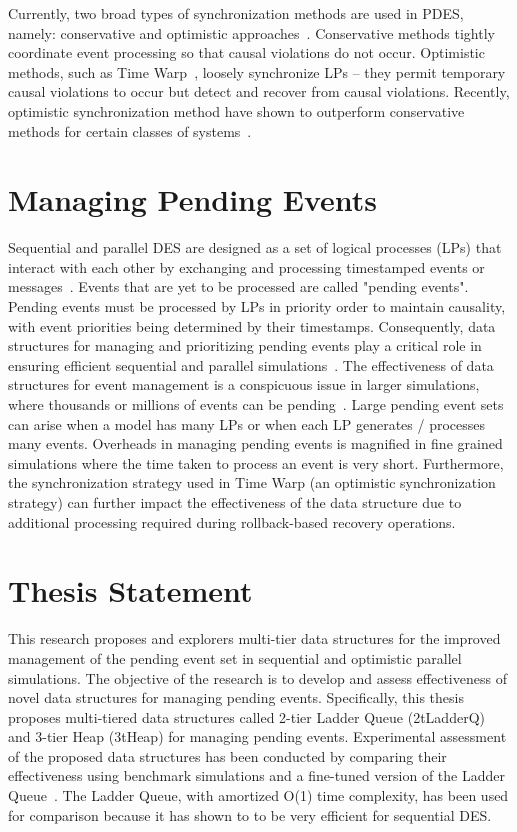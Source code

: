Currently, two broad types of synchronization methods are used in
PDES, namely: conservative and optimistic approaches~\cite{jafer-13}.
Conservative methods tightly coordinate event processing so that
causal violations do not occur.  Optimistic methods, such as Time
Warp~\cite{jafer-13}, loosely synchronize LPs -- they permit temporary
causal violations to occur but detect and recover from causal
violations.  Recently, optimistic synchronization method have shown to
outperform conservative methods for certain classes of
systems~\cite{jafer-13}.


\section{Managing Pending Events}

Sequential and parallel DES are designed as a set of logical processes
(LPs) that interact with each other by exchanging and processing
timestamped events or messages~\cite{jafer-13}. Events that are yet to
be processed are called "pending events". Pending events must be
processed by LPs in priority order to maintain causality, with event
priorities being determined by their timestamps. Consequently, data
structures for managing and prioritizing pending events play a
critical role in ensuring efficient sequential and parallel
simulations~\cite{jones-86,ronngren-97,brown-88,franceschini-15}. The
effectiveness of data structures for event management is a conspicuous
issue in larger simulations, where thousands or millions of events can
be pending~\cite{carothers-2010,yeom-14}. Large pending event sets can
arise when a model has many LPs or when each LP generates / processes
many events. Overheads in managing pending events is magnified in fine
grained simulations where the time taken to process an event is very
short. Furthermore, the synchronization strategy used in Time Warp (an
optimistic synchronization strategy) can further impact the
effectiveness of the data structure due to additional processing
required during rollback-based recovery operations.

\section{Thesis Statement}

This research proposes and explorers multi-tier data structures for
the improved management of the pending event set in sequential and
optimistic parallel simulations.  The objective of the research is to
develop and assess effectiveness of novel data structures for managing
pending events.  Specifically, this thesis proposes multi-tiered data
structures called 2-tier Ladder Queue (2tLadderQ) and 3-tier Heap
(3tHeap) for managing pending events.  Experimental assessment of the
proposed data structures has been conducted by comparing their
effectiveness using benchmark simulations and a fine-tuned version of
the Ladder Queue~\cite{tang-05}.  The Ladder Queue, with amortized
O(1) time complexity, has been used for comparison because it has
shown to to be very efficient for sequential DES. \newline


